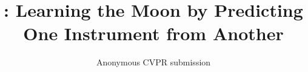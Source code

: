 \documentclass[10pt,twocolumn,letterpaper]{article}
\title{\method: Learning the Moon by Predicting One Instrument from Another}
\author{Anonymous CVPR submission}
\begin{document}
\maketitle







{
    \small
    
    
}


\end{document}
